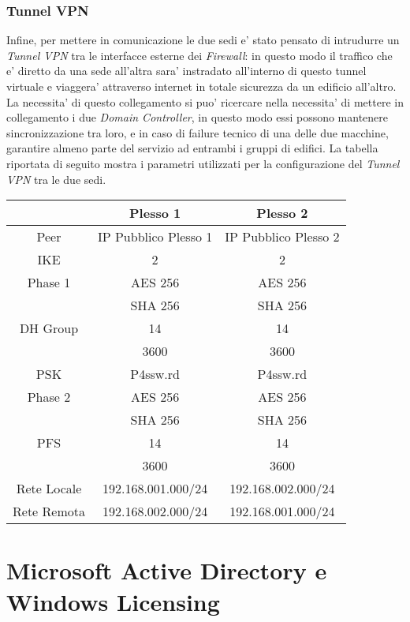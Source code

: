 \documentclass{report}
\begin{document}
			\subsection{Tunnel VPN}
				Infine, per mettere in comunicazione le due sedi e' stato pensato di intrudurre un \emph{Tunnel VPN}
				tra le interfacce esterne dei \emph{Firewall}: in questo modo il traffico che e' diretto da una sede
				all’altra sara' instradato all’interno di questo tunnel virtuale e viaggera' attraverso internet in
				totale sicurezza da un edificio all’altro. La necessita' di questo collegamento si puo' ricercare nella
				necessita' di mettere in collegamento i due \emph{Domain Controller}, in questo modo essi possono mantenere
				sincronizzazione tra loro, e in caso di failure tecnico di una delle due macchine, garantire almeno parte 
				del servizio ad entrambi i gruppi di edifici.
				La tabella riportata di seguito mostra i parametri utilizzati per la configurazione del \emph{Tunnel VPN} tra le
				due sedi.
				\begin{center}
					\begin{tabular}{ |c||c||c| }
						\hline
						& Plesso 1 & Plesso 2 \\
						\hline \hline
						Peer & IP Pubblico Plesso 1 & IP Pubblico Plesso 2 \\
						\hline
						IKE & 2 & 2 \\
						\hline
						Phase 1 & AES 256 & AES 256 \\
						& SHA 256 & SHA 256 \\
						\hline
						DH Group & 14 & 14 \\
						\hline
						& 3600 & 3600 \\
						\hline
						PSK & P4ssw.rd & P4ssw.rd \\
						\hline
						Phase 2  & AES 256 & AES 256 \\
						& SHA 256 & SHA 256 \\
						\hline
						PFS & 14 & 14 \\
						\hline
						& 3600 & 3600 \\
						\hline
						Rete Locale & 192.168.001.000/24 & 192.168.002.000/24 \\
						\hline
						Rete Remota & 192.168.002.000/24 & 192.168.001.000/24 \\
						\hline
					\end{tabular}
				\end{center}
	\chapter{Microsoft Active Directory e Windows Licensing}
	\author{Catone Mario}
\end{document}
